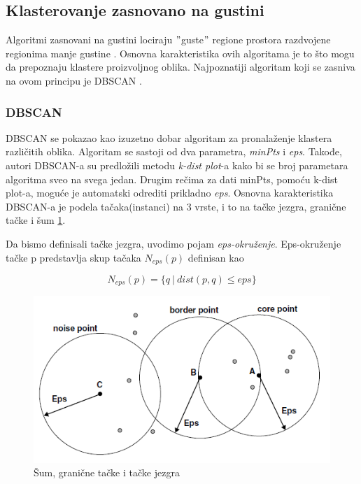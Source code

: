 \documentclass[a4paper]{article}
\begin{document}
\subsection{Klasterovanje zasnovano na gustini}

Algoritmi zasnovani na gustini lociraju $"$guste$"$ regione prostora razdvojene regionima manje gustine \cite{tan2016introduction}. Osnovna karakteristika ovih algoritama je to što mogu da prepoznaju klastere proizvoljnog oblika. Najpoznatiji algoritam koji se zasniva na ovom principu je DBSCAN \cite{Ester96adensity-based}.

\subsubsection{DBSCAN}
\label{DBSCAN}

DBSCAN se pokazao kao izuzetno dobar algoritam za pronalaženje klastera različitih oblika. Algoritam se sastoji od dva parametra, \textit{minPts} i \textit{eps}. Takođe, autori DBSCAN-a su predložili metodu \textit{k-dist plot}-a kako bi se broj parametara algoritma sveo na svega jedan. Drugim rečima za dati minPts, pomoću k-dist plot-a, moguće je automatski odrediti prikladno \textit{eps}. Osnovna karakteristika DBSCAN-a je podela tačaka(instanci) na 3 vrste, i to na tačke jezgra, granične tačke i šum \ref{core_pts}. 

Da bismo definisali tačke jezgra, uvodimo pojam \textit{eps-okruženje}.
Eps-okruženje tačke p predstavlja skup tačaka $N_{eps}(p)$ definisan kao 

\begin{equation}
	N_{eps}(p) = \{ q\ |\ dist(p, q) \leq eps \}
\end{equation}


\begin{figure}[h!]
\centering
\includegraphics[scale=0.7]{core_pts}
\caption{Šum, granične tačke i tačke jezgra}
\label{core_pts}
\end{figure}
\end{document}
